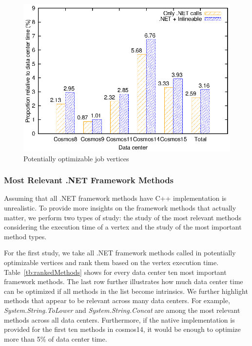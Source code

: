 \begin{figure}[ht]
\includegraphics[scale=0.8]{graphs/potentiallyOptimizable}

\caption{Potentially optimizable job vertices}
\label{fig:potentially}
\end{figure}

\subsubsection{Most Relevant .NET Framework Methods}
Assuming that all .NET framework methods have C++ implementation is unrealistic. 
To provide more insights on the framework methods that actually matter, we perform two types of study:
the study of the most relevant methods considering the execution time of a vertex and the study of the most important method types. 

For the first study, we take all .NET framework methods called in potentially optimizable vertices and rank them based on the vertex execution time. 
Table~\ref{tb:rankedMethods} shows for every data center ten most important framework methods. 
The last row further illustrates how much data center time can be optimized if all methods in the list become intrinsics.
We further highlight methods that appear to be relevant across many data centers.
For example, \emph{System.String.ToLower} and \emph{System.String.Concat} are among the most relevant methods across all data centers.
Furthermore, if the native implementation is provided for the first ten methods in cosmos14, it would be enough to optimize more than 5\% of data center time.

